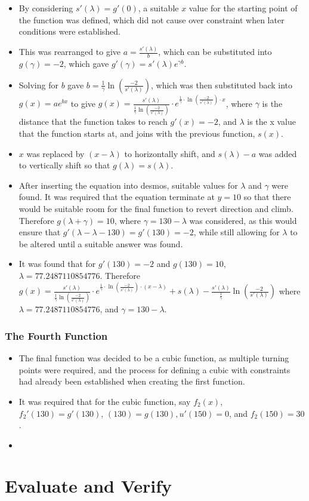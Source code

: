 \documentclass[11pt, letterpaper]{article}
\begin{document}
\begin{itemize}
	\item By considering $s'(\lambda)=g'(0)$, a suitable $x$ value for the starting point of the function was defined, which did not cause over constraint when later conditions were established. 
	\item This was rearranged to give $a=\frac{s'(\lambda)}{b}$, which can be substituted into $g(\gamma)=-2$, which gave $g'(\gamma)=s'(\lambda)e^{\gamma b}$.
		\item Solving for $b$ gave $b=\frac{1}{\gamma}\ln(\frac{-2}{s'(\lambda)})$, which was then substituted back into $g(x)=ae^{bx}$ to give $g(x)=\frac{s'(\lambda)}{\frac{1}{\gamma}\ln(\frac{-2}{s'(\lambda)})}\cdot e^{\frac{1}{\gamma}\cdot \ln (\frac{-2}{s'(\lambda)})\cdot x}$, where $\gamma$ is the distance that the function takes to reach $g'(x)=-2$, and $\lambda$ is the x value that the function starts at, and joins with the previous function, $s(x)$.
		
		\item $x$ was replaced by $(x-\lambda)$ to horizontally shift, and $s(\lambda)-a$ was added to vertically shift so that $g(\lambda)=s(\lambda)$.
		
		\item After inserting the equation into desmos, suitable values for $\lambda$ and $\gamma$ were found. It was required that the equation terminate at $y=10$ so that there would be suitable room for the final function to revert direction and climb. Therefore $g(\lambda + \gamma)=10$, where $\gamma=130-\lambda$ was considered, as this would ensure that $g'(\lambda-\lambda-130)=g'(130)=-2$, while still allowing for $\lambda$ to be altered until a suitable answer was found.
		
		\item It was found that for $g'(130)=-2$ and $g(130)=10$, $\lambda=77.2487110854776$. Therefore $g(x)=\frac{s'(\lambda)}{\frac{1}{\gamma}\ln(\frac{-2}{s'(\lambda)})}\cdot e^{\frac{1}{\gamma}\cdot \ln (\frac{-2}{s'(\lambda)})\cdot (x-\lambda)}+s\left(\lambda\right)-\frac{s'(\lambda)}{\frac{1}{\gamma}}\ln\left(\frac{-2}{s'\left(\lambda\right)}\right)$ where $\lambda=77.2487110854776$, and $\gamma=130-\lambda$.
\end{itemize}

\subsubsection{The Fourth Function}
\begin{itemize}
	\item The final function was decided to be a cubic function, as multiple turning points were required, and the process for defining a cubic with constraints had already been established when creating the first function. 
	
	\item It was required that for the cubic function, say $f_2(x)$, $f_2'(130)=g'(130)$, $(130)=g(130), u'(150)=0$, and $f_2(150)=30$. 
	
	\item  
\end{itemize}





\section{Evaluate and Verify}
\end{document}
